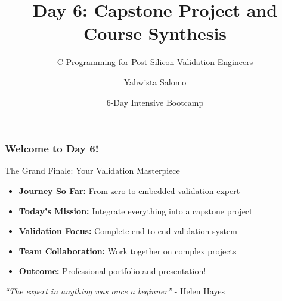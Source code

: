 \documentclass{beamer}
\title{Day 6: Capstone Project and Course Synthesis}
\subtitle{C Programming for Post-Silicon Validation Engineers}
\author{Yahwista Salomo}
\date{6-Day Intensive Bootcamp}
\institute{Post-Silicon Validation Training Program}
\begin{document}
\frame{\titlepage}

\begin{frame}
\frametitle{Welcome to Day 6!}
\begin{center}
\Large The Grand Finale: Your Validation Masterpiece
\end{center}

\begin{itemize}
    \item \textbf{Journey So Far:} From zero to embedded validation expert
    \item \textbf{Today's Mission:} Integrate everything into a capstone project
    \item \textbf{Validation Focus:} Complete end-to-end validation system
    \item \textbf{Team Collaboration:} Work together on complex projects
    \item \textbf{Outcome:} Professional portfolio and presentation!
\end{itemize}

\vspace{0.5cm}
\begin{center}
\textit{``The expert in anything was once a beginner''} - Helen Hayes
\end{center}
\end{frame}
\end{document}
